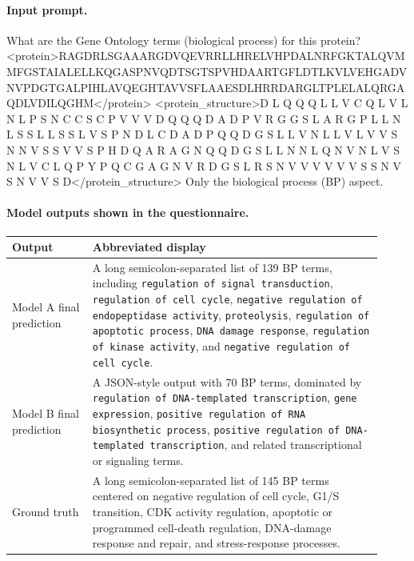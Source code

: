 \begin{appendices}
\paragraph{Input prompt.}
\begin{PromptBlock}
What are the Gene Ontology terms (biological process) for this protein?
<protein>RAGDRLSGAAARGDVQEVRRLLHRELVHPDALNRFGKTALQVMMFGSTAIALELLKQGASPNVQDTSGTSPVHDAARTGFLDTLKVLVEHGADV NVPDGTGALPIHLAVQEGHTAVVSFLAAESDLHRRDARGLTPLELALQRGAQDLVDILQGHM</protein>
<protein_structure>D L Q Q Q L L V C Q L V L N L P S N C C S C P V V V D Q Q Q D A D P V R G G S L A R G P L L N L S S L L S S L V S P N D L C D A D P Q Q D G S L L V N L L V L V V S N N V S S V V S P H D Q A R A G N Q Q D G S L L N N L Q N V N L V S N L V C L Q P Y P Q C G A G N V R D G S L R S N V V V V V V S S N V S N V V S D</protein_structure>
Only the biological process (BP) aspect.
\end{PromptBlock}

\paragraph{Model outputs shown in the questionnaire.}
\begin{longtable}{P{0.20\linewidth}P{0.72\linewidth}}
\toprule
\textbf{Output} & \textbf{Abbreviated display} \\
\midrule
Model A final prediction & A long semicolon-separated list of 139 BP terms, including \texttt{regulation of signal transduction}, \texttt{regulation of cell cycle}, \texttt{negative regulation of endopeptidase activity}, \texttt{proteolysis}, \texttt{regulation of apoptotic process}, \texttt{DNA damage response}, \texttt{regulation of kinase activity}, and \texttt{negative regulation of cell cycle}. \\
Model B final prediction & A JSON-style output with 70 BP terms, dominated by \texttt{regulation of DNA-templated transcription}, \texttt{gene expression}, \texttt{positive regulation of RNA biosynthetic process}, \texttt{positive regulation of DNA-templated transcription}, and related transcriptional or signaling terms. \\
Ground truth & A long semicolon-separated list of 145 BP terms centered on negative regulation of cell cycle, G1/S transition, CDK activity regulation, apoptotic or programmed cell-death regulation, DNA-damage response and repair, and stress-response processes. \\
\bottomrule
\end{longtable}


\end{appendices}
